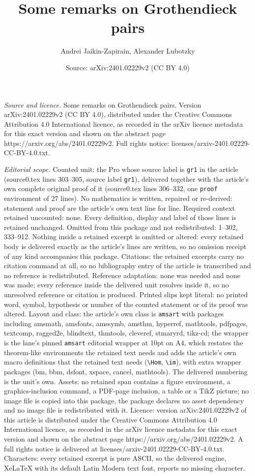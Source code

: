 \documentclass[10pt,a4paper]{amsart}
\title[Some remarks on Grothendieck pairs]{Some remarks on Grothendieck pairs}
\author{Andrei Jaikin-Zapirain, Alexander Lubotzky}
\date{Source: arXiv:2401.02229v2 (CC BY 4.0)}
\begin{document}
\maketitle

\noindent\emph{Source and licence.} Some remarks on Grothendieck pairs. Version arXiv:2401.02229v2 (CC BY 4.0), distributed under the Creative Commons Attribution 4.0 International licence, as recorded in the arXiv licence metadata for this exact version and shown on the abstract page https://arxiv.org/abs/2401.02229v2. Full rights notice: licenses/arxiv-2401.02229-CC-BY-4.0.txt.\par\smallskip

\noindent\textit{Editorial scope.} Counted unit: the Pro whose source label is \texttt{gr1} in the article (source0.tex lines 303--305, source label \texttt{gr1}), delivered together with the article's own complete original proof of it (source0.tex lines 306--332, one \texttt{proof} environment of 27 lines). No mathematics is written, repaired or re-derived: statement and proof are the article's own text line for line. Required context retained uncounted: none. Every definition, display and label of those lines is retained unchanged. Omitted from this package and not redistributed: 1--302, 333--912. Nothing inside a retained excerpt is omitted or altered: every retained body is delivered exactly as the article's lines are written, so no omission receipt of any kind accompanies this package. Citations: the retained excerpts carry no citation command at all, so no bibliography entry of the article is transcribed and no reference is redistributed. Reference adaptation: none was needed and none was made; every reference inside the delivered unit resolves inside it, so no unresolved reference or citation is produced. Printed slips kept literal: no printed word, symbol, hypothesis or number of the counted statement or of its proof was altered. Layout and class: the article's own class is \texttt{amsart} with packages including amsmath, amsfonts, amssymb, amsthm, hyperref, mathtools, pdfpages, textcomp, ragged2e, blindtext, thmtools, cleveref, stmaryrd, tikz-cd; the wrapper is the lane's pinned \texttt{amsart} editorial wrapper at 10pt on A4, which restates the theorem-like environments the retained text needs and adds the article's own macro definitions that the retained text needs (\texttt{\textbackslash Hom}, \texttt{\textbackslash im}), with extra wrapper packages (bm, bbm, dsfont, xspace, cancel, mathtools). The delivered numbering is the unit's own. Assets: no retained span contains a figure environment, a graphics-inclusion command, a PDF-page inclusion, a table or a TikZ picture; no image file is copied into this package, the package declares no asset dependency and no image file is redistributed with it. Licence: version arXiv:2401.02229v2 of this article is distributed under the Creative Commons Attribution 4.0 International licence, as recorded in the arXiv licence metadata for this exact version and shown on the abstract page https://arxiv.org/abs/2401.02229v2. A full rights notice is delivered at licenses/arxiv-2401.02229-CC-BY-4.0.txt. Characters: every retained excerpt is pure ASCII, so the delivered engine, XeLaTeX with its default Latin Modern text font, reports no missing character.
\end{document}
